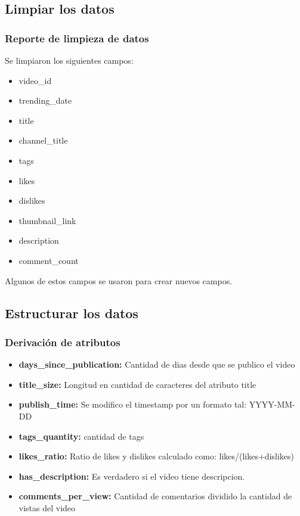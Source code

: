 \subsection{Limpiar los datos}
    \subsubsection{Reporte de limpieza de datos}
        Se limpiaron los siguientes campos:
        \begin{itemize}
            \item video\_id
            \item trending\_date
            \item title
            \item channel\_title
            \item tags
            \item likes
            \item dislikes
            \item thumbnail\_link
            \item description
            \item comment\_count
        \end{itemize}
        Algunos de estos campos se usaron para crear nuevos campos.
\subsection{Estructurar los datos}
    \subsubsection{Derivación de atributos}
        \begin{itemize}
            \item \textbf{days\_since\_publication:} Cantidad de dias desde que se publico el video
            \item \textbf{title\_size:} Longitud en cantidad de caracteres del atributo title
            \item \textbf{publish\_time:} Se modifico el timestamp por un formato tal: YYYY-MM-DD
            \item \textbf{tags\_quantity:} cantidad de tags
            \item \textbf{likes\_ratio:} Ratio de likes y dislikes calculado como: likes/(likes+dislikes)
            \item \textbf{has\_description:} Es verdadero si el video tiene descripcion.
            \item \textbf{comments\_per\_view:} Cantidad de comentarios dividido la cantidad de vistas del video
        \end{itemize}

